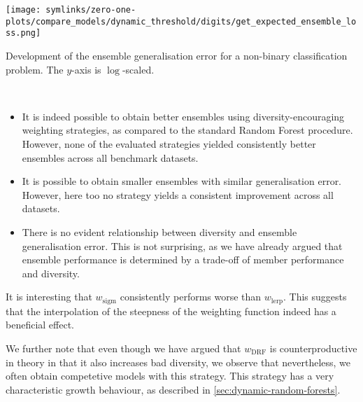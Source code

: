 \documentclass[../main.tex]{subfiles}
\begin{document}
 \begin{marginfigure}
    \texttt{[image: symlinks/zero-one-plots/compare\_models/dynamic\_threshold/digits/get\_expected\_ensemble\_loss.png]}
    \caption{Development of the ensemble generalisation error for a non-binary classification problem.
    The $y$-axis is $\log$-scaled.}
    \label{fig:dynamic_thresholds-digits-ensemble_loss}
 \end{marginfigure}

 \begin{observation} ~~ %
    \begin{itemize}
        \item It is indeed possible to obtain better ensembles using diversity-encouraging weighting strategies, as compared to the standard Random Forest procedure. However, none of the evaluated strategies yielded consistently better ensembles across all benchmark datasets.
        \item It is possible to obtain smaller ensembles with similar generalisation error. However, here too no strategy yields a consistent improvement across all datasets.
        \item There is no evident relationship between diversity and ensemble generalisation error. This is not surprising, as we have already argued that ensemble performance is determined by a trade-off of member performance and diversity. 
    \end{itemize}
 \end{observation}

 It is interesting that $w_\text{sigm}$ consistently performs worse than $w_\text{lerp}$. This suggests that the interpolation of the steepness of the weighting function indeed has a beneficial effect.

 We further note that even though we have argued that $w_\text{DRF}$ is counterproductive in theory in that it also increases bad diversity, we observe that nevertheless, we often obtain competetive models with this strategy. This strategy has a very characteristic growth behaviour, as described in \cref{sec:dynamic-random-forests}.




\end{document}
